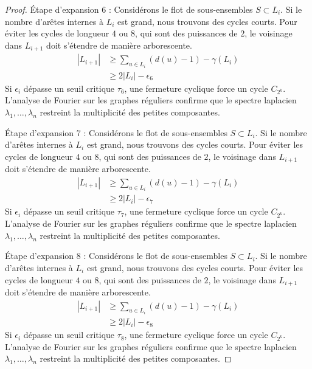 \documentclass[11pt,a4paper]{article}
\theoremstyle{definition}
\begin{document}
\begin{proof}
Étape d'expansion 6 :
Considérons le flot de sous-ensembles $S \subset L_i$. Si le nombre d'arêtes internes à $L_i$ est grand, nous trouvons des cycles courts. Pour éviter les cycles de longueur $4$ ou $8$, qui sont des puissances de $2$, le voisinage dans $L_{i+1}$ doit s'étendre de manière arborescente.
\begin{align*}
|L_{i+1}| &\ge \sum_{u \in L_i} (d(u) - 1) - \gamma(L_i) \\
&\ge 2|L_i| - \epsilon_6
\end{align*}
Si $\epsilon_i$ dépasse un seuil critique $\tau_6$, une fermeture cyclique force un cycle $C_{2^k}$.
L'analyse de Fourier sur les graphes réguliers confirme que le spectre laplacien $\lambda_1, \dots, \lambda_n$ restreint la multiplicité des petites composantes.

Étape d'expansion 7 :
Considérons le flot de sous-ensembles $S \subset L_i$. Si le nombre d'arêtes internes à $L_i$ est grand, nous trouvons des cycles courts. Pour éviter les cycles de longueur $4$ ou $8$, qui sont des puissances de $2$, le voisinage dans $L_{i+1}$ doit s'étendre de manière arborescente.
\begin{align*}
|L_{i+1}| &\ge \sum_{u \in L_i} (d(u) - 1) - \gamma(L_i) \\
&\ge 2|L_i| - \epsilon_7
\end{align*}
Si $\epsilon_i$ dépasse un seuil critique $\tau_7$, une fermeture cyclique force un cycle $C_{2^k}$.
L'analyse de Fourier sur les graphes réguliers confirme que le spectre laplacien $\lambda_1, \dots, \lambda_n$ restreint la multiplicité des petites composantes.

Étape d'expansion 8 :
Considérons le flot de sous-ensembles $S \subset L_i$. Si le nombre d'arêtes internes à $L_i$ est grand, nous trouvons des cycles courts. Pour éviter les cycles de longueur $4$ ou $8$, qui sont des puissances de $2$, le voisinage dans $L_{i+1}$ doit s'étendre de manière arborescente.
\begin{align*}
|L_{i+1}| &\ge \sum_{u \in L_i} (d(u) - 1) - \gamma(L_i) \\
&\ge 2|L_i| - \epsilon_8
\end{align*}
Si $\epsilon_i$ dépasse un seuil critique $\tau_8$, une fermeture cyclique force un cycle $C_{2^k}$.
L'analyse de Fourier sur les graphes réguliers confirme que le spectre laplacien $\lambda_1, \dots, \lambda_n$ restreint la multiplicité des petites composantes.


\end{proof}
\end{document}
